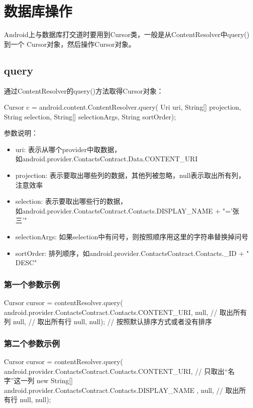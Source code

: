 ﻿
\section[数据库操作]{数据库操作}
Android上与数据库打交道时要用到Cursor类，一般是从ContentResolver中query()到一个
Cursor对象，然后操作Cursor对象。

\subsection[query]{query}
通过ContentResolver的query()方法取得Cursor对象：

\begin{javacode}
Cursor c = android.content.ContentResolver.query(
    Uri uri,
    String[] projection,
    String selection,
    String[] selectionArgs,
    String sortOrder);
\end{javacode}

参数说明：

\begin{itemize}
\item uri: 表示从哪个provider中取数据，\\如android.provider.ContactsContract.Data.CONTENT\_URI
\item projection: 表示要取出哪些列的数据，其他列被忽略，null表示取出所有列，注意效率
\item selection: 表示要取出哪些行的数据，\\如android.provider.ContactsContract.Contacts.DISPLAY\_NAME + "='张三'"
\item selectionArgs: 如果selection中有问号，则按照顺序用这里的字符串替换掉问号
\item sortOrder: 排列顺序，如android.provider.ContactsContract.Contacts.\_ID + " DESC"
\end{itemize}

\subsubsection[第一个参数示例]{第一个参数示例}
\begin{javacode}
Cursor cursor = contentResolver.query(
    android.provider.ContactsContract.Contacts.CONTENT_URI,
    null, // 取出所有列
    null, // 取出所有行
    null,
    null); // 按照默认排序方式或者没有排序
\end{javacode}

\subsubsection[第二个参数示例]{第二个参数示例}
\begin{javacode}
Cursor cursor = contentResolver.query(
    android.provider.ContactsContract.Contacts.CONTENT_URI,
    // 只取出“名字”这一列
    new String[]{ android.provider.ContactsContract.Contacts.DISPLAY_NAME },
    null, // 取出所有行
    null,
    null);
\end{javacode}

